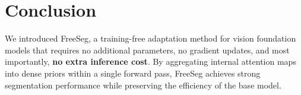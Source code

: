 \documentclass[conference]{IEEEtran}
\begin{document}
\section{Conclusion}
We introduced FreeSeg, a training-free adaptation method for vision foundation models that requires no additional parameters, no gradient updates, and most importantly, \textbf{no extra inference cost}. By aggregating internal attention maps into dense priors within a single forward pass, FreeSeg achieves strong segmentation performance while preserving the efficiency of the base model.



\end{document}
